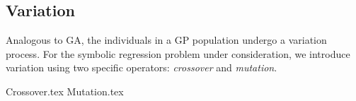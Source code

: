 \subsection{Variation}
\label{sec:bg:gp:variation}
  Analogous to GA, the individuals in a GP population undergo a variation
  process.
  For the symbolic regression problem under consideration, we introduce
  variation using two specific operators: \emph{crossover} and \emph{mutation}.

  {Crossover.tex}
  {Mutation.tex}
%